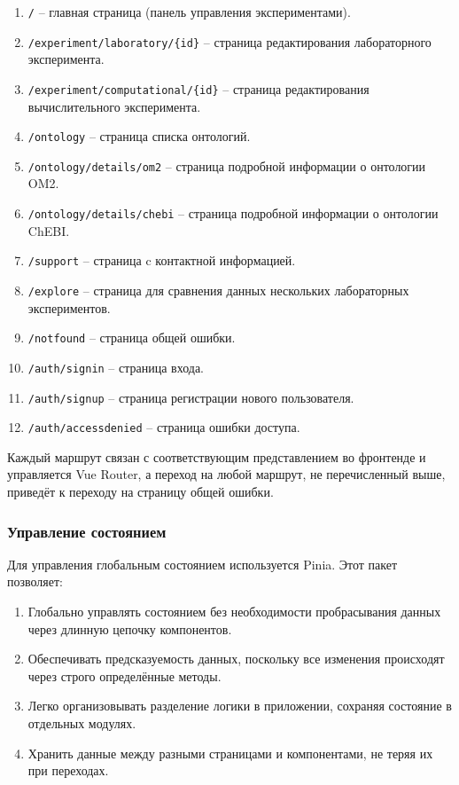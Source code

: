 \begin{enumerate}
\item \texttt{/} -- главная страница (панель управления экспериментами).
\item \texttt{/experiment/laboratory/\{id\}} -- страница редактирования лабораторного эксперимента.
\item \texttt{/experiment/computational/\{id\}} -- страница редактирования вычислительного эксперимента.
\item \texttt{/ontology} -- страница списка онтологий.
\item \texttt{/ontology/details/om2} -- страница подробной информации о онтологии OM2.
\item \texttt{/ontology/details/chebi} -- страница подробной информации о онтологии ChEBI.
\item \texttt{/support} -- страница c контактной информацией.
\item \texttt{/explore} -- страница для сравнения данных нескольких лабораторных экспериментов.
\item \texttt{/notfound} -- страница общей ошибки.
\item \texttt{/auth/signin} -- страница входа.
\item \texttt{/auth/signup} -- страница регистрации нового пользователя.
\item \texttt{/auth/accessdenied} -- страница ошибки доступа.
\end{enumerate}

Каждый маршрут связан с соответствующим представлением во фронтенде и управляется Vue Router, а переход на любой маршрут, не перечисленный выше, приведёт к переходу на страницу общей ошибки.

\subsubsection{Управление состоянием}

Для управления глобальным состоянием используется Pinia.
Этот пакет позволяет:

\begin{enumerate}
\item Глобально управлять состоянием без необходимости пробрасывания данных через длинную цепочку компонентов.
\item Обеспечивать предсказуемость данных, поскольку все изменения происходят через строго определённые методы.
\item Легко организовывать разделение логики в приложении, сохраняя состояние в отдельных модулях.
\item Хранить данные между разными страницами и компонентами, не теряя их при переходах.
\end{enumerate}

